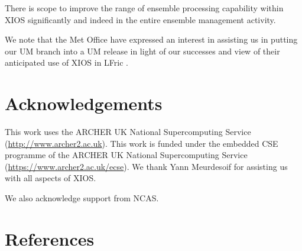 \documentclass[twocolumn, 5p, times]{elsarticle}
\begin{document}
There is scope to improve the range of ensemble processing capability within XIOS significantly and indeed in the entire ensemble management activity.

We note that the Met Office have expressed an interest in assisting us in putting our UM branch into a UM release in light of our successes and view of their anticipated use of XIOS in LFric \cite{Lfric}.





\clearpage

\section*{Acknowledgements}

This work uses the ARCHER UK National Supercomputing Service (\url{http://www.archer2.ac.uk}). This work is funded under the embedded CSE programme of the ARCHER UK National Supercomputing Service (\url{https://www.archer2.ac.uk/ecse}). 
We thank Yann Meurdesoif for assisting us with all aspects of XIOS.


We also acknowledge support from NCAS.

\section*{References}



\end{document}
